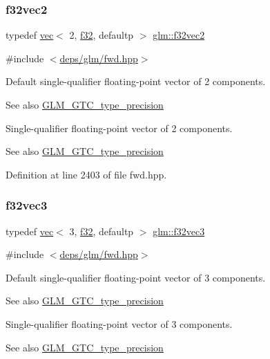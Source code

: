 \subsubsection{\texorpdfstring{f32vec2}{f32vec2}}
{\footnotesize\ttfamily typedef \hyperlink{structglm_1_1vec}{vec}$<$ 2, \hyperlink{group__gtc__type__precision_ga0ec999b57f5330d9021256e96038df04}{f32}, defaultp $>$ \hyperlink{group__gtc__type__precision_gaeb896022a9c59e8c3c4ce627c66c9262}{glm\+::f32vec2}}



{\ttfamily \#include $<$\hyperlink{fwd_8hpp}{deps/glm/fwd.\+hpp}$>$}

Default single-\/qualifier floating-\/point vector of 2 components. \begin{DoxySeeAlso}{See also}
\hyperlink{group__gtc__type__precision}{G\+L\+M\+\_\+\+G\+T\+C\+\_\+type\+\_\+precision}
\end{DoxySeeAlso}
Single-\/qualifier floating-\/point vector of 2 components. \begin{DoxySeeAlso}{See also}
\hyperlink{group__gtc__type__precision}{G\+L\+M\+\_\+\+G\+T\+C\+\_\+type\+\_\+precision} 
\end{DoxySeeAlso}


Definition at line 2403 of file fwd.\+hpp.

\mbox{\label{group__gtc__type__precision_ga4d08db2a75d1e8f85e0edbbd76f18ecf}} 
\subsubsection{\texorpdfstring{f32vec3}{f32vec3}}
{\footnotesize\ttfamily typedef \hyperlink{structglm_1_1vec}{vec}$<$ 3, \hyperlink{group__gtc__type__precision_ga0ec999b57f5330d9021256e96038df04}{f32}, defaultp $>$ \hyperlink{group__gtc__type__precision_ga4d08db2a75d1e8f85e0edbbd76f18ecf}{glm\+::f32vec3}}



{\ttfamily \#include $<$\hyperlink{fwd_8hpp}{deps/glm/fwd.\+hpp}$>$}

Default single-\/qualifier floating-\/point vector of 3 components. \begin{DoxySeeAlso}{See also}
\hyperlink{group__gtc__type__precision}{G\+L\+M\+\_\+\+G\+T\+C\+\_\+type\+\_\+precision}
\end{DoxySeeAlso}
Single-\/qualifier floating-\/point vector of 3 components. \begin{DoxySeeAlso}{See also}
\hyperlink{group__gtc__type__precision}{G\+L\+M\+\_\+\+G\+T\+C\+\_\+type\+\_\+precision} 
\end{DoxySeeAlso}


